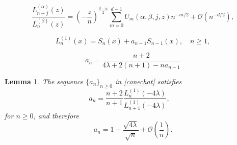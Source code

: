 \documentclass[10pt,a4paper]{amsart}
\newtheorem{lemma}{Lemma}
\begin{document}
\begin{equation} \label{asymp_expan}
\frac{L_{n+j}^{(\alpha)}(z)}{L_{n}^{(\beta)}(z)}
=\left(-\frac{z}{n}\right)^{\frac{\beta-\alpha}{2}}\sum_{m=0}^{d-1} U_m(\alpha,\beta,j,z)n^{-m/2}+\mathcal{O}(n^{-d/2}),
\end{equation}

\begin{equation}\label{conechat}
L_{n}^{(1)} (x)= S_{n}(x) + {a}_{n-1}S_{n-1}(x), \quad n\geqslant 1,
\end{equation}

\begin{equation} \label{rec_rel_an}
a_n = \frac{n+2}{4 \lambda + 2(n+1) - n a_{n-1}}
\end{equation}

\begin{lemma} The sequence $\{a_n\}_{n\geq 0}$ in \eqref{conechat} satisfies
\begin{equation} \label{rat_func_an}
a_n  = \frac{n+2}{n+1} \frac{L^{(1)}_{n}(-4\lambda)}{ L^{(1)}_{n+1}(-4\lambda)}, \quad
\end{equation}
for $n\geqslant 0$, and therefore
\begin{equation} \label{lim_an}
 a_n =1 - \frac{\sqrt{4\lambda}}{\sqrt{n}} +\mathcal{O}(\frac{1}{n}) .
\end{equation}
\end{lemma}
\end{document}
